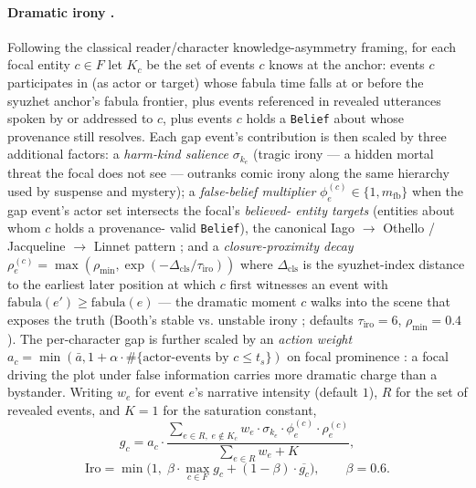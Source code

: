 \documentclass[11pt]{article}
\begin{document}
\paragraph{Dramatic irony
\citep{booth1974irony,muecke1969compass,gerrig1993narrative,pfister1988drama}.}
Following the classical reader/character knowledge-asymmetry
framing, for each focal entity $c \in F$
let $K_c$ be the set of events $c$ knows at the anchor: events
$c$ participates in (as actor or target) whose fabula time falls
at or before the syuzhet anchor's fabula frontier, plus events
referenced in revealed utterances spoken by or addressed to $c$,
plus events $c$ holds a \texttt{Belief} about whose provenance
still resolves. Each gap event's contribution is then scaled by
three additional factors: a \emph{harm-kind salience}
$\sigma_{k_e}$ (tragic irony --- a hidden mortal threat the
focal does not see --- outranks comic irony along the same
hierarchy used by suspense and mystery); a \emph{false-belief
multiplier} $\phi_e^{(c)} \in \{1, m_{\mathrm{fb}}\}$ when the
gap event's actor set intersects the focal's \emph{believed-
entity targets} (entities about whom $c$ holds a provenance-
valid \texttt{Belief}), the canonical Iago $\to$ Othello /
Jacqueline $\to$ Linnet pattern \citep{pfister1988drama,
cabanas2024toM}; and a \emph{closure-proximity decay}
$\rho_e^{(c)} = \max(\rho_{\min}, \exp(-\Delta_{\mathrm{cls}}/\tau_{\mathrm{iro}}))$
where $\Delta_{\mathrm{cls}}$ is the syuzhet-index distance to
the earliest later position at which $c$ first witnesses an
event with $\mathrm{fabula}(e') \ge \mathrm{fabula}(e)$ ---
the dramatic moment $c$ walks into the scene that exposes the
truth (Booth's stable vs. unstable irony \citep{booth1974irony};
defaults $\tau_{\mathrm{iro}} = 6$, $\rho_{\min} = 0.4$). The
per-character gap is further scaled by an \emph{action weight}
$a_c = \min(\bar a, 1 + \alpha \cdot \#\{\text{actor-events
by } c \le t_s\})$ on focal prominence
\citep{pfister1988drama,sutherland2013little}: a focal driving
the plot under false information carries more dramatic charge
than a bystander. Writing $w_e$ for event $e$'s narrative
intensity (default $1$), $R$ for the set of revealed events,
and $K = 1$ for the saturation constant,
\begin{equation}
g_c = a_c \cdot \frac{
\sum_{e \in R,\; e \notin K_c} w_e \cdot \sigma_{k_e} \cdot \phi_e^{(c)} \cdot \rho_e^{(c)}
}{\sum_{e \in R} w_e + K},
\end{equation}
\begin{equation}
\label{eq:irony}
\mathrm{Iro} = \min\!\big(1,\; \beta \cdot \max_{c \in F} g_c + (1 - \beta) \cdot \overline{g_c}\big), \qquad \beta = 0.6.
\end{equation}
\end{document}
